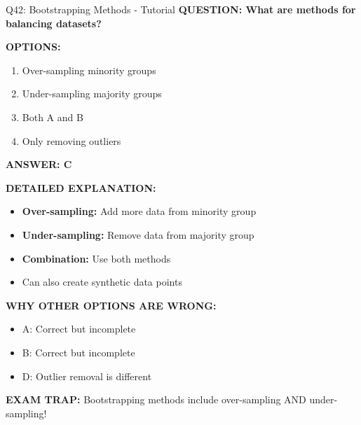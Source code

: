 \documentclass[8pt]{beamer}
\begin{document}
	\begin{frame}{Q42: Bootstrapping Methods - Tutorial}
		\fontsize{6.5}{7.5}\selectfont
		\textbf{QUESTION: What are methods for balancing datasets?}
		
		\vspace{0.1cm}
		\textbf{OPTIONS:}
		\begin{enumerate}
			\item Over-sampling minority groups
			\item Under-sampling majority groups
			\item Both A and B
			\item Only removing outliers
		\end{enumerate}
		
		\vspace{0.1cm}
		\textcolor{myblue}{\textbf{ANSWER: C}}
		
		\vspace{0.1cm}
		\textbf{DETAILED EXPLANATION:}
		\begin{itemize}
			\item \textbf{Over-sampling:} Add more data from minority group
			\item \textbf{Under-sampling:} Remove data from majority group
			\item \textbf{Combination:} Use both methods
			\item Can also create synthetic data points
		\end{itemize}
		
		\vspace{0.1cm}
		\textcolor{myred}{\textbf{WHY OTHER OPTIONS ARE WRONG:}}
		\begin{itemize}
			\item \textcolor{myred}{A:} Correct but incomplete
			\item \textcolor{myred}{B:} Correct but incomplete
			\item \textcolor{myred}{D:} Outlier removal is different
		\end{itemize}
		
		\textcolor{myred}{\textbf{EXAM TRAP:}} Bootstrapping methods include \textcolor{myblue}{over-sampling AND under-sampling}!
	\end{frame}
	
\end{document}
